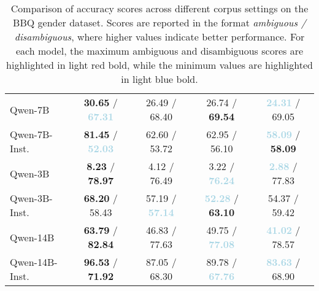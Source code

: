 \documentclass[11pt,a4paper]{article}
\begin{document}
\begin{table*}[t]
\begin{tabular}{lcccc}
    Qwen-7B            
         & \textbf{\textcolor{lightred}{30.65}} / \textbf{\textcolor{lightblue}{67.31}} 
         & 26.49 / 68.40 
         & 26.74 / \textbf{\textcolor{lightred}{69.54}} 
         & \textbf{\textcolor{lightblue}{24.31}} / 69.05   \\
    Qwen-7B-Inst.       
         & \textbf{\textcolor{lightred}{81.45}} / \textbf{\textcolor{lightblue}{52.03}} 
         & 62.60 / 53.72 
         & 62.95 / 56.10 
         & \textbf{\textcolor{lightblue}{58.09}} / \textbf{\textcolor{lightred}{58.09}}   \\
    Qwen-3B         
         & \textbf{\textcolor{lightred}{8.23}} / \textbf{\textcolor{lightred}{78.97}} 
         & 4.12 / 76.49 
         & 3.22 / \textbf{\textcolor{lightblue}{76.24}} 
         & \textbf{\textcolor{lightblue}{2.88}} / 77.83   \\
    Qwen-3B-Inst.    
         & \textbf{\textcolor{lightred}{68.20}} / 58.43 
         & 57.19 / \textbf{\textcolor{lightblue}{57.14}} 
         & \textbf{\textcolor{lightblue}{52.28}} / \textbf{\textcolor{lightred}{63.10}} 
         & 54.37 / 59.42   \\
    Qwen-14B       
         & \textbf{\textcolor{lightred}{63.79}} / \textbf{\textcolor{lightred}{82.84}} 
         & 46.83 / 77.63 
         & 49.75 / \textbf{\textcolor{lightblue}{77.08}} 
         & \textbf{\textcolor{lightblue}{41.02}} / 78.57   \\
    Qwen-14B-Inst.   
         & \textbf{\textcolor{lightred}{96.53}} / \textbf{\textcolor{lightred}{71.92}} 
         & 87.05 / 68.30 
         & 89.78 / \textbf{\textcolor{lightblue}{67.76}} 
         & \textbf{\textcolor{lightblue}{83.63}} / 68.90   \\
\bottomrule
\end{tabular}
\caption{Comparison of accuracy scores across different corpus settings on the BBQ gender dataset. Scores are reported in the format \textit{ambiguous / disambiguous}, where higher values indicate better performance. For each model, the maximum ambiguous and disambiguous scores are highlighted in light red bold, while the minimum values are highlighted in light blue bold.}
\label{tbl:generators:accuracy}
\end{table*}
\end{document}
